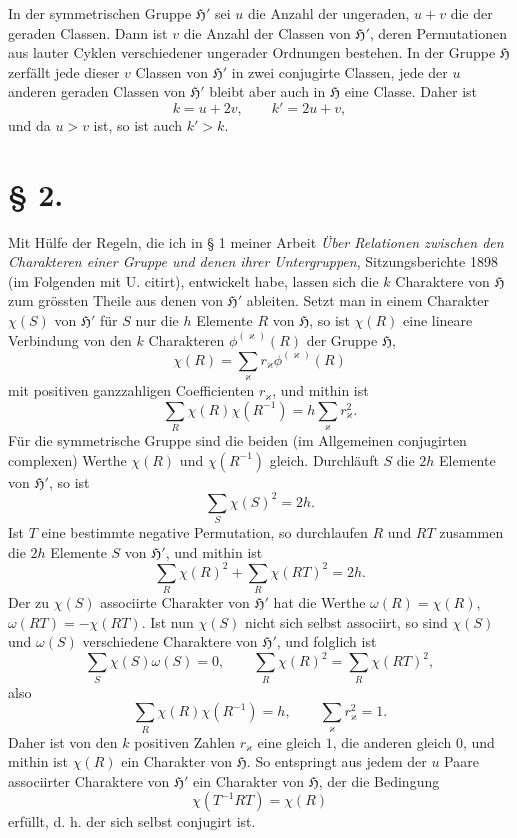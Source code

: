 \documentclass[11pt]{article}
\newcommand{\Hgr}{\mathfrak{H}}
\begin{document}
In der symmetrischen Gruppe $\Hgr'$ sei $u$ die Anzahl der ungeraden, $u+v$ die der geraden Classen. Dann ist $v$ die Anzahl der Classen von $\Hgr'$, deren Permutationen aus lauter Cyklen verschiedener ungerader Ordnungen bestehen. In der Gruppe $\Hgr$ zerfällt jede dieser $v$ Classen von $\Hgr'$ in zwei conjugirte Classen, jede der $u$ anderen geraden Classen von $\Hgr'$ bleibt aber auch in $\Hgr$ eine Classe. Daher ist
\begin{equation}\tag{3.}
 k=u+2v,	\qquad k'=2u+v,
\end{equation}
und da $u>v$ ist, so ist auch $k'>k$.

\section*{§ 2.}

Mit Hülfe der Regeln, die ich in § 1 meiner Arbeit \emph{Über Relationen zwischen den Charakteren einer Gruppe und denen ihrer Untergruppen}, Sitzungsberichte 1898 (im Folgenden mit U. citirt), entwickelt habe, lassen sich die $k$ Charaktere von $\Hgr$ zum grössten Theile aus denen von $\Hgr'$ ableiten. Setzt man in einem Charakter $\chi(S)$ von $\Hgr'$ für $S$ nur die $h$ Elemente $R$ von $\Hgr$, so ist $\chi(R)$ eine lineare Verbindung von den $k$ Charakteren $\phi^{(\varkappa)}(R)$ der Gruppe $\Hgr$,
\[
 \chi(R)=\sum_{\varkappa} r_\varkappa\phi^{(\varkappa)}(R)
\]
mit positiven ganzzahligen Coefficienten $r_\varkappa$, und mithin ist
\[
 \sum_R \chi(R)\chi(R^{-1})=h\sum_\varkappa r_\varkappa^2.
\]
Für die symmetrische Gruppe sind die beiden (im Allgemeinen conjugirten complexen) Werthe $\chi(R)$ und $\chi(R^{-1})$ gleich. Durchläuft $S$ die $2h$ Elemente von $\Hgr'$, so ist
\[
 \sum_S \chi(S)^2=2h.
\]
Ist $T$ eine bestimmte negative Permutation, so durchlaufen $R$ und $RT$ zusammen die $2h$ Elemente $S$ von $\Hgr'$, und mithin ist
\[
 \sum_R \chi(R)^2+\sum_R \chi(RT)^2=2h.
\]
Der zu $\chi(S)$ associirte Charakter von $\Hgr'$ hat die Werthe $\omega(R)=\chi(R)$, $\omega(RT)=-\chi(RT)$. Ist nun $\chi(S)$ nicht sich selbst associirt, so sind $\chi(S)$ und $\omega(S)$ verschiedene Charaktere von $\Hgr'$, und folglich ist
\[
 \sum_S \chi(S)\omega(S)=0,\qquad \sum_R \chi(R)^2=\sum_R\chi(RT)^2,
\]
also
\[
 \sum_R\chi(R)\chi(R^{-1})=h,	\qquad \sum_\varkappa r_\varkappa^2=1.
\]
Daher ist von den $k$ positiven Zahlen $r_\varkappa$ eine gleich $1$, die anderen gleich $0$, und mithin ist $\chi(R)$ ein Charakter von $\Hgr$. So entspringt aus jedem der $u$ Paare associirter Charaktere von $\Hgr'$ ein Charakter von $\Hgr$, der die Bedingung
\begin{equation}\tag{1.}
 \chi(T^{-1}RT)=\chi(R)
\end{equation}
erfüllt, d. h. der sich selbst conjugirt ist.
\end{document}
